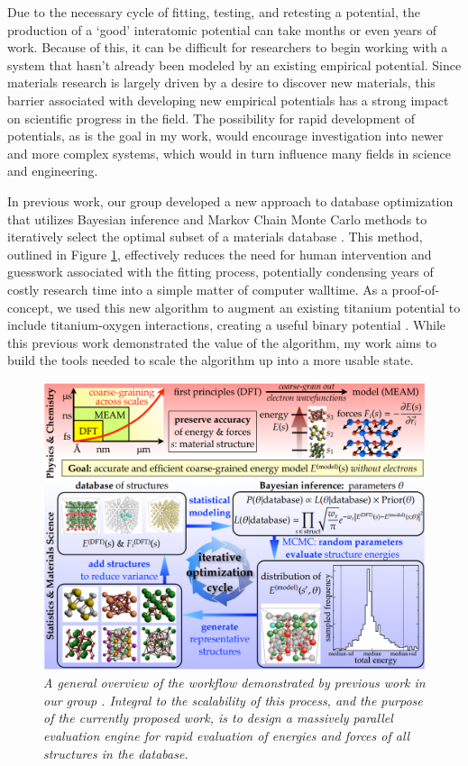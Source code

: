 \documentclass{article}
\begin{document}
Due to the necessary cycle of fitting, testing, and retesting a potential, the production of a `good' interatomic potential can take months or even years of work. Because of this, it can be difficult for researchers to begin working with a system that hasn't already been modeled by an existing empirical potential. Since materials research is largely driven by a desire to discover new materials, this barrier associated with developing new empirical potentials has a strong impact on scientific progress in the field. The possibility for rapid development of potentials, as is the goal in my work, would encourage investigation into newer and more complex systems, which would in turn influence many fields in science and engineering.

\bigskip

In previous work, our group developed a new approach to database optimization that utilizes Bayesian inference \cite{baye} and Markov Chain Monte Carlo methods to iteratively select the optimal subset of a materials database \cite{dbopt}. This method, outlined in Figure \ref{fig:workflow}, effectively reduces the need for human intervention and guesswork associated with the fitting process, potentially condensing years of costly research time into a simple matter of computer walltime. As a proof-of-concept, we used this new algorithm to augment an existing titanium potential to include titanium-oxygen interactions, creating a useful binary potential \cite{tio}. While this previous work demonstrated the value of the algorithm, my work aims to build the tools needed to scale the algorithm up into a more usable state.

\begin{figure}
  \centering
  \includegraphics[width=0.65\linewidth]{workflow.png}
  \caption{\textit{A general overview of the workflow demonstrated by previous work in our group \cite{dbopt}. Integral to the scalability of this process, and the purpose of the currently proposed work, is to design a massively parallel evaluation engine for rapid evaluation of energies and forces of all structures in the database.}}
  \label{fig:workflow}
\end{figure}
\end{document}
